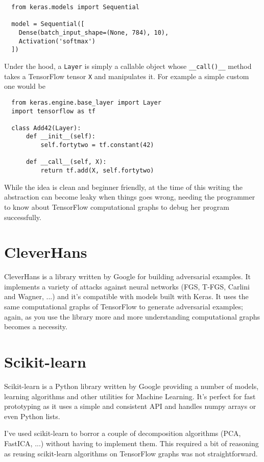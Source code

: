 \begin{verbatim}
  from keras.models import Sequential

  model = Sequential([
    Dense(batch_input_shape=(None, 784), 10),
    Activation('softmax')
  ])
\end{verbatim}

Under the hood, a \texttt{Layer} is simply a callable object whose
\texttt{\_\_call()\_\_} method takes a TensorFlow tensor \texttt{X} and
manipulates it. For example a simple custom one would be
\begin{verbatim}
  from keras.engine.base_layer import Layer
  import tensorflow as tf

  class Add42(Layer):
      def __init__(self):
          self.fortytwo = tf.constant(42)

      def __call__(self, X):
          return tf.add(X, self.fortytwo)
\end{verbatim}

While the idea is clean and beginner friendly, at the time of this writing the
abstraction can become leaky when things goes wrong, needing the programmer to know
about TensorFlow computational graphs to debug her program successfully.

\section{CleverHans}
\label{sec:cleverhans}

CleverHans is a library written by Google for building adversarial examples. It
implements a variety of attacks against neural networks (FGS, T-FGS, Carlini and
Wagner, ...) and it's compatible with models built with Keras. It uses the same
computational graphs of TensorFlow to generate adversarial examples; again, as
you use the library more and more understanding computational graphs becomes a
necessity.

\section{Scikit-learn}
\label{sec:sklearn}

Scikit-learn is a Python library written by Google providing a number of models,
learning algorithms and other utilities for Machine Learning. It's perfect for
fast prototyping as it uses a simple and consistent API and handles numpy arrays
or even Python lists.

I've used scikit-learn to borror a couple of decomposition algorithms (PCA, FastICA, ...)
without having to implement them. This required a bit of reasoning as reusing scikit-learn algorithms on
TensorFlow graphs was not straightforward.
